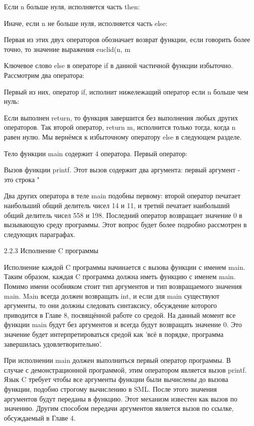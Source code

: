 Если n больше нуля, исполняется часть then:

Иначе, если n не больше нуля, исполняется часть else:

Первая из этих двух операторов обозначает возврат функции, если говорить более точно, то значение выражения euclid(n, m%

Ключевое слово else в операторе if в данной частичной функции избыточно. Рассмотрим два оператора:

Первый из них, оператор if, исполнит нижележащий оператор если n больше чем нуль:

Если выполнен return, то функция завершится без выполнения любых других операторов. Так второй оператор, return m, исполнится только тогда, когда n равен нулю. Мы вернёмся к избыточному оператору else в следующем разделе.

Тело функции main содержит 4 оператора. Первый оператор:

Вызов функции printf. Этот вызов содержит два аргумента: первый аргумент - это строка "%

Два других оператора в теле main подобны первому: второй оператор печатает наибольший общий делитель чисел 14 и 11, и третий печатает наибольший общий делитель чисел 558 и 198. Последний оператор возвращает значение 0 в вызывающую среду программы. Этот вопрос будет более подробно рассмотрен в следующих параграфах.

2.2.3 Исполнение C программы

Исполнение каждой C программы начинается с вызова функции с именем main. Таким образом, каждая C программа должна иметь функцию с именем main. Помимо имени особняком стоит тип аргументов и тип возвращаемого значения main. Main всегда должен возвращать int, и если для main существуют аргументы, то они должны следовать синтаксису, обсуждение которого приводится в Главе 8, посвящённой работе со средой. На данный момент все функции main будут без аргументов и всегда будут возвращать значение 0. Это значение будет интерпретироваться средой как 'всё в порядке, программа завершилась удовлетворительно'.

При исполнении main должен выполниться первый оператор программы. В случае с демонстрационной программой, этим оператором является вызов printf. Язык C требует чтобы все аргументы функции были вычислены до вызова функции, подобно строгому вычислению в SML. После этого значения аргументов будут переданы в функцию. Этот механизм известен как вызов по значению. Другим способом передачи аргументов является вызов по ссылке, обсуждаемый в Главе 4.

